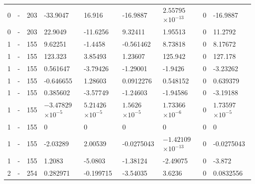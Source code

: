 \begin{longtable}
{}0 & \allowbreak{}-\allowbreak{} & 203 & -33.9047 & 16.916 & -16.9887 &  & 0 & -16.9887 \\
{}0 & \allowbreak{}-\allowbreak{} & 203 & 22.9049 & -11.6256 & 9.32411 & 1.95513 & 0 & 11.2792 \\
{}1 & \allowbreak{}-\allowbreak{} & 155 & 9.62251 & -1.4458 & -0.561462 & 8.73818 & 0 & 8.17672 \\
{}1 & \allowbreak{}-\allowbreak{} & 155 & 123.323 & 3.85493 & 1.23607 & 125.942 & 0 & 127.178 \\
{}1 & \allowbreak{}-\allowbreak{} & 155 & 0.561647 & -3.79426 & -1.29001 & -1.9426 & 0 & -3.23262 \\
{}1 & \allowbreak{}-\allowbreak{} & 155 & -0.646655 & 1.28603 & 0.0912276 & 0.548152 & 0 & 0.639379 \\
{}1 & \allowbreak{}-\allowbreak{} & 155 & 0.385602 & -3.57749 & -1.24603 & -1.94586 & 0 & -3.19188 \\
{}1 & \allowbreak{}-\allowbreak{} & 155 &  &  &  &  & 0 &  \\
{}1 & \allowbreak{}-\allowbreak{} & 155 & 0 & 0 & 0 & 0 & 0 & 0 \\
{}1 & \allowbreak{}-\allowbreak{} & 155 & -2.03289 & 2.00539 & -0.0275043 &  & 0 & -0.0275043 \\
{}1 & \allowbreak{}-\allowbreak{} & 155 & 1.2083 & -5.0803 & -1.38124 & -2.49075 & 0 & -3.872 \\
{}2 & \allowbreak{}-\allowbreak{} & 254 & 0.282971 & -0.199715 & -3.54035 & 3.6236 & 0 & 0.0832556 \\

\end{longtable}
